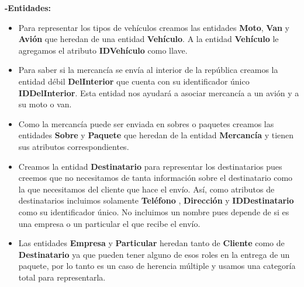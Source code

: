 \documentclass[letterpaper,11pt]{article}
\begin{document}
\begin{itemize}
\textbf{-Entidades:}
\begin{itemize}
    \item Para representar los tipos de vehículos creamos las entidades \textbf{Moto}, \textbf{Van} y \textbf{Avión} que heredan de una entidad \textbf{Vehículo}. A la entidad \textbf{Vehículo} le agregamos el atributo \textbf{IDVehículo} como llave.
    \item Para saber si la mercancía se envía al interior de la república creamos la entidad débil \textbf{DelInterior} que cuenta con su identificador único \textbf{IDDelInterior}. Esta entidad nos ayudará a asociar mercancía a un avión y a su moto o van.
    \item Como la mercancía puede ser enviada en sobres o paquetes creamos las entidades \textbf{Sobre} y \textbf{Paquete} que heredan de la entidad \textbf{Mercancía} y tienen sus atributos correspondientes.
    \item Creamos la entidad \textbf{Destinatario} para representar los destinatarios pues creemos que no necesitamos de tanta información sobre el destinatario como la que necesitamos del cliente que hace el envío. Así, como atributos de destinatarios incluimos solamente \textbf{Teléfono} , \textbf{Dirección} y \textbf{IDDestinatario} como su identificador único. No incluimos un nombre pues depende de si es una empresa o un particular el que recibe el envío.
   \item Las entidades \textbf{Empresa} y \textbf{Particular} heredan tanto de \textbf{Cliente} como de \textbf{Destinatario} ya que pueden tener alguno de esos roles en la entrega de un paquete, por lo tanto es un caso de herencia múltiple y usamos una categoría total para representarla.
\end{itemize}


\end{itemize}
\end{document}
